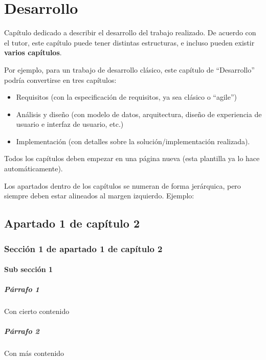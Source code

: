 \chapter{Desarrollo}
Capítulo dedicado a describir el desarrollo del trabajo realizado. De acuerdo con el tutor, este capítulo puede tener distintas estructuras, e incluso pueden existir \textbf{varios capítulos}.

Por ejemplo, para un trabajo de desarrollo clásico, este capítulo de ``Desarrollo'' podría convertirse en tres capítulos:

\begin{itemize}
\item Requisitos (con la especificación de requisitos, ya sea clásico o ``agile'')
\item Análisis y diseño (con  modelo de datos, arquitectura, diseño de experiencia de usuario e interfaz de usuario, etc.)
\item Implementación (con detalles sobre la solución/implementación realizada).
\end{itemize}

Todos los capítulos deben empezar en una página nueva (esta plantilla ya lo hace automáticamente).

Los apartados dentro de los capítulos se numeran de forma jerárquica, pero siempre deben estar alineados al margen izquierdo. Ejemplo:

\section{Apartado 1 de capítulo 2}

\subsection{Sección 1 de apartado 1 de capítulo 2}

\subsubsection{Sub sección 1}

\paragraph{Párrafo 1} Con cierto contenido

\paragraph{Párrafo 2} Con más contenido

